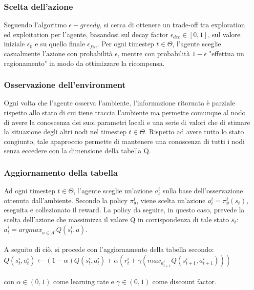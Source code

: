 \documentclass{article}
\begin{document}
\subsubsection{Scelta dell'azione}
Seguendo l'algoritmo $\epsilon-greedy$, si cerca di ottenere un trade-off tra exploration ed exploitation per l'agente, basandosi sul decay factor $\epsilon_{dec} \in[0, 1]$, sul valore iniziale $\epsilon_0$ e su quello finale $\epsilon_{fin}$. Per ogni timestep $t \in \Theta$, l'agente sceglie casualmente l'azione con probabilità $\epsilon$, mentre con probabilità $1 - \epsilon$ "effettua un ragionamento" in modo da ottimizzare la ricompensa.

\subsubsection{Osservazione dell'environment}
Ogni volta che l'agente osserva l'ambiente, l'informazione ritornata è parziale rispetto allo stato di cui tiene traccia l'ambiente ma permette comunque al nodo di avere la conoscenza dei suoi parametri locali e una serie di valori che di stimare la situazione degli altri nodi nel timestep $t \in \Theta$. Rispetto ad avere tutto lo stato congiunto, tale apaproccio permette di mantenere una conoscenza di tutti i nodi senza eccedere con la dimensione della tabella Q.

\subsubsection{Aggiornamento della tabella}
Ad ogni timestep $t \in \Theta$, l'agente sceglie un'azione $a_t^i$ sulla base dell'osservazione ottenuta dall'ambiente. Secondo la policy $\pi_{\theta}^i$, viene scelta un'azione $a_t^i = \pi_\theta^i(s_t)$, eseguita e collezionato il reward. La policy da seguire, in questo caso, prevede la scelta  dell'azione che massimizza il valore Q in corrispondenza di tale stato $s_t$: $a_t^i = argmax_{a \in A^i} Q(s_t^i, a)$.\\\\ A seguito di ciò, si procede con l'aggiornamento della tabella secondo:\\

$Q(s_t^i, a_t^i) \leftarrow (1-\alpha)Q(s_t^i, a_t^i) + \alpha(r_t^i + \gamma(max_{a_{t+1}^i} Q(s_{t+1}^i, a_{t+1}^i)))$ \\\\
con $\alpha \in (0, 1)$ come learning rate e $\gamma \in (0, 1)$ come discount factor. 
\end{document}
